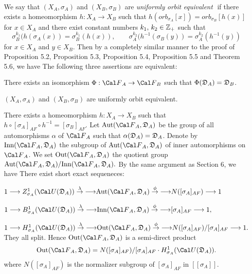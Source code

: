 {We say that 
$(X_A, \sigma_A)$ and $(X_B,\sigma_B)$  
are
 {\it uniformly orbit equivalent}\,\
if there exists a homeomorphism 
$h:X_A \rightarrow X_B$ such that 
$h(orb_{\sigma_A}[x]) = orb_{\sigma_B}[h(x)]$ for $x \in X_A$
and
there exist constant numbers
$k_1,\, k_2\in { {\Bbb Z}_+ }$
such that
$$
\sigma_B^{k_1} (h(\sigma_A(x)) = \sigma_B^{k_1}(h(x)),
\qquad
\sigma_A^{k_2} (h^{-1}(\sigma_B(y)) = \sigma_A^{k_2}(h^{-1}(y)) 
$$
for $x \in X_A$ and $y \in X_B$.
Then by a completely similar manner to
the proof of Proposition 5.2, Proposition 5.3, Proposition 5.4, Proposition 5.5
and Theorem 5.6,
we have
The following three assertions  are  equivalent:
 \roster
 \item There exists an isomorphism $\Phi: \FA \rightarrow  \FB$
 such that $\Phi({{\frak D}_A}) = {{\frak D}_B}$.
\item
$(X_A, \sigma_A)$ and $(X_B, \sigma_B)$ are uniformly orbit equivalent.
\item There exists a homeomorphism $h: X_A \rightarrow X_B$ such that
$h \circ [\sigma_A ]_{AF} \circ h^{-1} = [\sigma_B ]_{AF}$. 
\endroster
\endproclaim
Let $\Aut(\FA,\DA)$
be the group of all automorphisms $\alpha$ of 
$\FA$ such that $\alpha({{\frak D}_A}) = {{\frak D}_A}$.  
Denote by $\Inn(\FA,\DA)$ the subgroup of $\Aut(\FA,\DA)$ 
of inner automorphisms
on $\FA$.
We set 
$
\Out(\FA,\DA) 
$
the quotient group
$\Aut(\FA,\DA)/\Inn(\FA,\DA).$
By the same argument as Section 6, we have
There exist short exact sequeneces:
\roster
\item
$
1 
\longrightarrow Z_{\sigma_A}^1({\Cal U}(\DA))
\overset{\lambda}\to{\longrightarrow} \Aut(\FA,\DA)
\overset{\phi}\to{\longrightarrow} N([\sigma_A ]_{AF})
\longrightarrow 1
$
\item
$
1 
\longrightarrow B_{\sigma_A}^1({\Cal U}(\DA))
\overset{\lambda}\to{\longrightarrow} \Inn(\FA,\DA)
\overset{\phi}\to{\longrightarrow} [\sigma_A ]_{AF}
\longrightarrow 1,
$
\item
$
1 
\longrightarrow H_{\sigma_A}^1({\Cal U}(\DA))
\overset{\lambda}\to{\longrightarrow} \Out(\FA,\DA)
\overset{\phi}\to{\longrightarrow} N([\sigma_A ]_{AF}) / [\sigma_A ]_{AF}
\longrightarrow 1.
$
\endroster
They all split. 
Hence  
$
\Out(\FA,\DA)
$
is a  semi-direct product
$$
\Out(\FA,\DA)
= N([\sigma_A ]_{AF}) / [\sigma_A ]_{AF} \cdot H_{\sigma_A}^1({\Cal U}(\DA)).
$$ 
\endproclaim
where
$ N([\sigma_A ]_{AF})$ is the normalizer subgroup
of
$[\sigma_A ]_{AF}$
in 
$[[\sigma_A]]$.


\Refs
{}
\widestnumber{}



}
